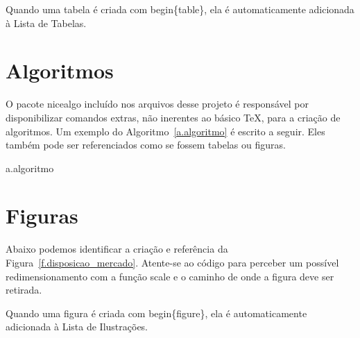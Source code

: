 Quando uma tabela é criada com begin\{table\}, ela é automaticamente adicionada à Lista de Tabelas.

\section{Algoritmos}
\label{s.algoritmos}

O pacote nicealgo incluído nos arquivos desse projeto é responsável por disponibilizar comandos extras, não inerentes ao básico TeX, para a criação de algoritmos. Um exemplo do Algoritmo~\ref{a.algoritmo} é escrito a seguir. Eles também pode ser referenciados como se fossem tabelas ou figuras.

\begin{nicealgo}{a.algoritmo}
\naPREAMBLE
{}
\naBODY
{}
\naEND{}
\naEND{}
\naEND{}
\naEND{}
\naEND{}
\end{nicealgo}

\section{Figuras}
\label{s.figuras}

Abaixo podemos identificar a criação e referência da Figura~\ref{f.disposicao_mercado}. Atente-se ao código para perceber um possível redimensionamento com a função scale e o caminho de onde a figura deve ser retirada.

Quando uma figura é criada com begin\{figure\}, ela é automaticamente adicionada à Lista de Ilustrações.

